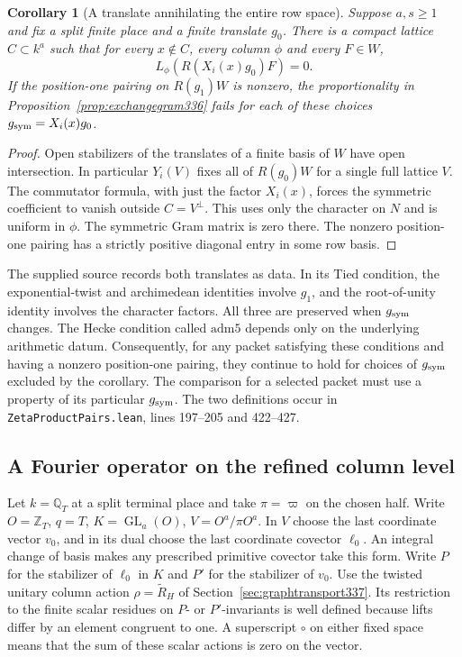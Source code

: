 \documentclass[a4paper,11pt]{article}
\newtheorem{corollary}[proposition]{Corollary}
\theoremstyle{definition}
\theoremstyle{remark}
\numberwithin{equation}{section}
\newcommand{\GL}{\operatorname{GL}}
\begin{document}
\begin{corollary}[A translate annihilating the entire row space]\label{cor:zerotranslate336}
Suppose \(a,s\ge1\) and fix a split finite place and a finite
translate \(g_0\). There is a compact lattice \(C\subset k^a\)
such that for every \(x\notin C\), every column \(\phi\) and
every \(F\in W\),
\[
             L_\phi(R(X_i(x)g_0)F)=0 .
\]
If the position-one pairing on \(R(g_1)W\) is nonzero, the
proportionality in Proposition~\ref{prop:exchangegram336} fails
for each of these choices \(g_{\rm sym}=X_i(x)g_0\).
\end{corollary}
\begin{proof}
Open stabilizers of the translates of a finite basis of \(W\)
have open intersection. In particular \(Y_i(V)\) fixes all of
\(R(g_0)W\) for a single full lattice \(V\). The commutator
formula, with just the factor \(X_i(x)\), forces the symmetric
coefficient to vanish outside \(C=V^\perp\). This uses only
the character on \(N\) and is uniform in \(\phi\). The symmetric
Gram matrix is zero there. The nonzero position-one pairing
has a strictly positive diagonal entry in some row basis.
\end{proof}

The supplied source records both translates as data. In its
\(\mathrm{Tied}\) condition, the exponential-twist and
archimedean identities involve \(g_1\), and the root-of-unity
identity involves the character factors. All three are preserved
when \(g_{\rm sym}\) changes. The Hecke condition called
\(\mathrm{adm5}\) depends only on the underlying arithmetic datum.
Consequently, for any packet satisfying these conditions and
having a nonzero position-one pairing, they continue to hold
for choices of \(g_{\rm sym}\) excluded by the corollary. The
comparison for a selected packet must use a property of its
particular \(g_{\rm sym}\). The two definitions occur in
\texttt{ZetaProductPairs.lean}, lines 197--205 and 422--427.


\subsection{A Fourier operator on the refined column level}\label{sec:incidence338}
Let \(k=\mathbb Q_T\) at a split terminal place and take
\(\pi=\varpi\) on the chosen half. Write \(O=\mathbb Z_T\),
\(q=T\), \(K=\GL_a(O)\), \(V=O^a/\pi O^a\).
In \(V\) choose the last coordinate vector \(v_0\), and in its
dual choose the last coordinate covector \(\ell_0\). An integral
change of basis makes any prescribed primitive covector take this
form. Write \(P\) for the stabilizer of \(\ell_0\) in \(K\) and
\(P'\) for the stabilizer of \(v_0\). Use the twisted unitary
column action \(\rho=\widetilde R_H\) of
Section~\ref{sec:graphtransport337}. Its restriction to the finite
scalar residues on \(P\)- or \(P'\)-invariants is well defined
because lifts differ by an element congruent to one.
A superscript \(\circ\) on either fixed space means that the
sum of these scalar actions is zero on the vector.
\end{document}
